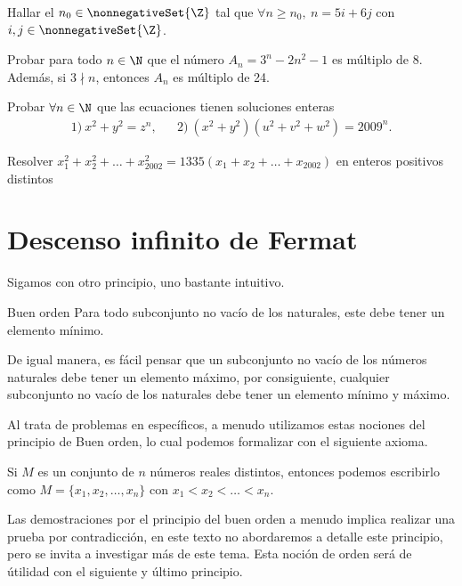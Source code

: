 \begin{exercise}
    Hallar el $n_0 \in \nonnegativeSet{\Z}$ tal que $\forall n \geq n_0,\ n = 5i + 6j$ con $i,j \in \nonnegativeSet{\Z}$.
\end{exercise}

\begin{exercise}
    Probar para todo $n \in \N$ que el número $A_n = 3^n - 2n^2 - 1$ es múltiplo de $8$.
    Además, si $3\nmid n$, entonces $A_n$ es múltiplo de 24.
\end{exercise}

\begin{problem}
    Probar $\forall n \in \N$ que las ecuaciones tienen soluciones enteras
    \begin{align*}
        1)\ x^2 + y^2 = z^n, && 2)\ (x^2 + y^2)(u^2 + v^2 + w^2) = 2009^n.
    \end{align*}
\end{problem}

\begin{problem}
    Resolver $x_1^2 + x_2^2 + \dots + x_{2002}^2 = 1335\left(x_1 + x_2 + \dots + x_{2002}\right)$ en enteros positivos distintos
\end{problem}


\section{Descenso infinito de Fermat}

Sigamos con otro principio, uno bastante intuitivo.
\begin{principle.box}{Buen orden}{}
    Para todo subconjunto no vacío de los naturales, este debe tener un elemento mínimo.
\end{principle.box}
De igual manera, es fácil pensar que un subconjunto no vacío de los números naturales debe tener un elemento máximo,
por consiguiente, cualquier subconjunto no vacío de los naturales debe tener un elemento mínimo y máximo.

Al trata de problemas en específicos, a menudo utilizamos estas nociones del principio de Buen orden, lo cual podemos
formalizar con el siguiente axioma.
\begin{axiom}
    Si $M$ es un conjunto de $n$ números reales distintos, entonces podemos escribirlo como $M = \{x_1,x_2,\ldots,x_n\}$
    con $x_1 < x_2 < \ldots < x_n$.
\end{axiom}
Las demostraciones por el principio del buen orden a menudo implica realizar una prueba por contradicción, en este texto
no abordaremos a detalle este principio, pero se invita a investigar más de este tema.
Esta noción de orden será de útilidad con el siguiente y último principio.

